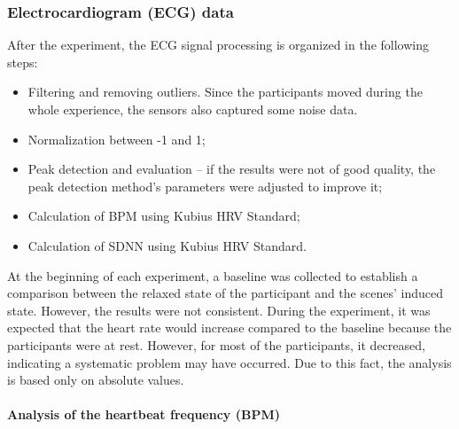 \subsubsection{Electrocardiogram (ECG) data}
\label{subsubsec:results_ecg_1}


After the experiment, the ECG signal processing is organized in the following steps: 

\begin{itemize}
    \item Filtering and removing outliers. Since the participants moved during the whole experience, the sensors also captured some noise data.
    \item Normalization between -1 and 1;
    \item Peak detection and evaluation – if the results were not of good quality, the peak detection method's parameters were adjusted to improve it; 
    \item Calculation of BPM using Kubius HRV Standard;
    \item Calculation of SDNN using Kubius HRV Standard.
\end{itemize}

%    

At the beginning of each experiment, a baseline was collected to establish a comparison between the relaxed state of the participant and the scenes' induced state. However, the results were not consistent.  During the experiment, it was expected that the heart rate would increase compared to the baseline because the participants were at rest. However, for most of the participants, it decreased, indicating a systematic problem may have occurred. Due to this fact, the analysis is based only on absolute values.

\paragraph*{Analysis of the heartbeat frequency (BPM)}\mbox{}\\

%
%

